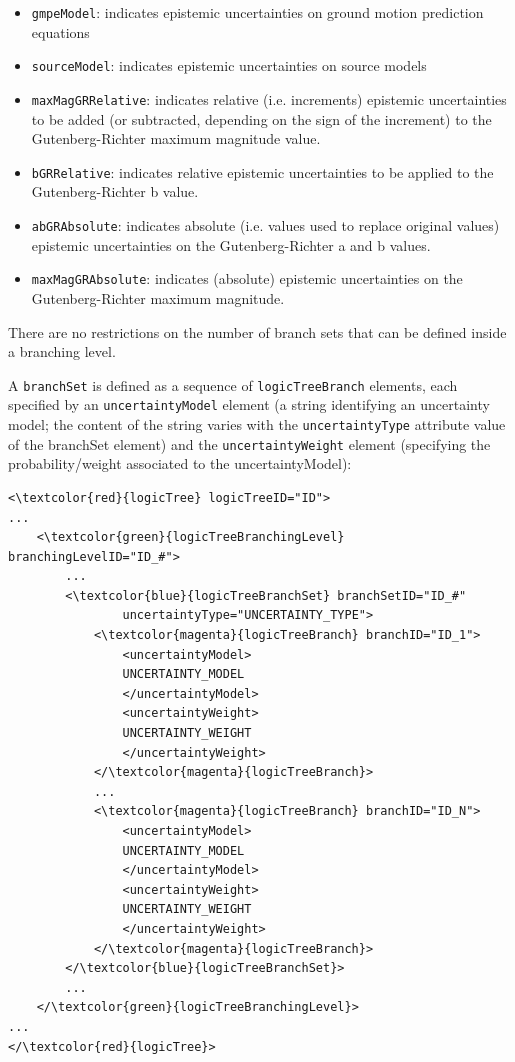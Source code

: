 \label{list_epistemic_unc}
\begin{itemize}

    \item \Verb+gmpeModel+: indicates epistemic uncertainties on ground
	motion prediction equations

	\item \Verb+sourceModel+: indicates epistemic uncertainties on source models

    \item \Verb+maxMagGRRelative+: indicates relative (i.e. increments)
	epistemic uncertainties to be added (or subtracted, depending on the sign
	of the increment) to the Gutenberg-Richter maximum magnitude value.

    \item \Verb+bGRRelative+: indicates relative epistemic uncertainties
	to be applied to the Gutenberg-Richter b value.

    \item \Verb+abGRAbsolute+: indicates absolute (i.e. values used to replace
	original values) epistemic uncertainties on the Gutenberg-Richter a and b
	values.

    \item \Verb+maxMagGRAbsolute+: indicates (absolute) epistemic
	uncertainties on the Gutenberg-Richter maximum magnitude.

\end{itemize}

There are no restrictions on the number of branch sets that can be defined
inside a branching level.

A \Verb+branchSet+ is defined as a sequence of \Verb+logicTreeBranch+
elements, each specified by an \Verb+uncertaintyModel+ element (a string
identifying an uncertainty model; the content of the string varies with the
\texttt{uncertaintyType} attribute value of the branchSet element) and the
\texttt{uncertaintyWeight} element (specifying the probability/weight
associated to the uncertaintyModel):

\begin{Verbatim}[frame=single, commandchars=\\\{\}]
<\textcolor{red}{logicTree} logicTreeID="ID">
...
	<\textcolor{green}{logicTreeBranchingLevel} branchingLevelID="ID_#">
		...
		<\textcolor{blue}{logicTreeBranchSet} branchSetID="ID_#"
				uncertaintyType="UNCERTAINTY_TYPE">
			<\textcolor{magenta}{logicTreeBranch} branchID="ID_1">
				<uncertaintyModel>
				UNCERTAINTY_MODEL
				</uncertaintyModel>
				<uncertaintyWeight>
				UNCERTAINTY_WEIGHT
				</uncertaintyWeight>
			</\textcolor{magenta}{logicTreeBranch}>
			...
			<\textcolor{magenta}{logicTreeBranch} branchID="ID_N">
				<uncertaintyModel>
				UNCERTAINTY_MODEL
				</uncertaintyModel>
				<uncertaintyWeight>
				UNCERTAINTY_WEIGHT
				</uncertaintyWeight>
			</\textcolor{magenta}{logicTreeBranch}>
		</\textcolor{blue}{logicTreeBranchSet}>
		...
	</\textcolor{green}{logicTreeBranchingLevel}>
...
</\textcolor{red}{logicTree}>
\end{Verbatim}

